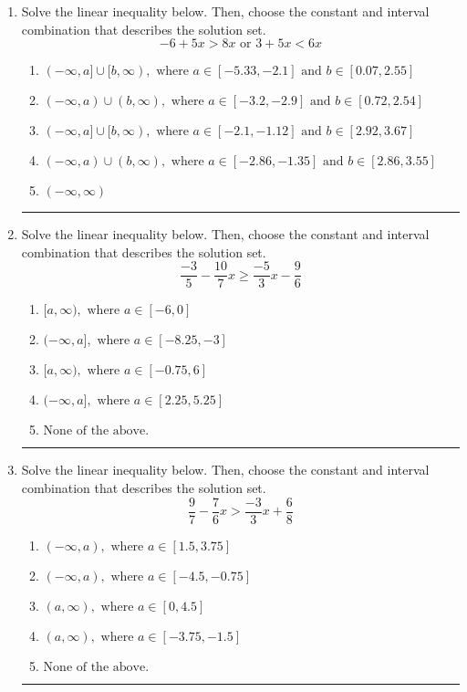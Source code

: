 \documentclass[14pt]{extbook}
\newcommand{\litem}[1]{\item#1\hspace*{-1cm}\rule{\textwidth}{0.4pt}}
\begin{document}
\begin{enumerate}
\litem{
Solve the linear inequality below. Then, choose the constant and interval combination that describes the solution set.\[ -6 + 5 x > 8 x \text{ or } 3 + 5 x < 6 x \]\begin{enumerate}[label=\Alph*.]
\item \( (-\infty, a] \cup [b, \infty), \text{ where } a \in [-5.33, -2.1] \text{ and } b \in [0.07, 2.55] \)
\item \( (-\infty, a) \cup (b, \infty), \text{ where } a \in [-3.2, -2.9] \text{ and } b \in [0.72, 2.54] \)
\item \( (-\infty, a] \cup [b, \infty), \text{ where } a \in [-2.1, -1.12] \text{ and } b \in [2.92, 3.67] \)
\item \( (-\infty, a) \cup (b, \infty), \text{ where } a \in [-2.86, -1.35] \text{ and } b \in [2.86, 3.55] \)
\item \( (-\infty, \infty) \)

\end{enumerate} }
\litem{
Solve the linear inequality below. Then, choose the constant and interval combination that describes the solution set.\[ \frac{-3}{5} - \frac{10}{7} x \geq \frac{-5}{3} x - \frac{9}{6} \]\begin{enumerate}[label=\Alph*.]
\item \( [a, \infty), \text{ where } a \in [-6, 0] \)
\item \( (-\infty, a], \text{ where } a \in [-8.25, -3] \)
\item \( [a, \infty), \text{ where } a \in [-0.75, 6] \)
\item \( (-\infty, a], \text{ where } a \in [2.25, 5.25] \)
\item \( \text{None of the above}. \)

\end{enumerate} }
\litem{
Solve the linear inequality below. Then, choose the constant and interval combination that describes the solution set.\[ \frac{9}{7} - \frac{7}{6} x > \frac{-3}{3} x + \frac{6}{8} \]\begin{enumerate}[label=\Alph*.]
\item \( (-\infty, a), \text{ where } a \in [1.5, 3.75] \)
\item \( (-\infty, a), \text{ where } a \in [-4.5, -0.75] \)
\item \( (a, \infty), \text{ where } a \in [0, 4.5] \)
\item \( (a, \infty), \text{ where } a \in [-3.75, -1.5] \)
\item \( \text{None of the above}. \)


\end{enumerate}}
\end{enumerate}
\end{document}

